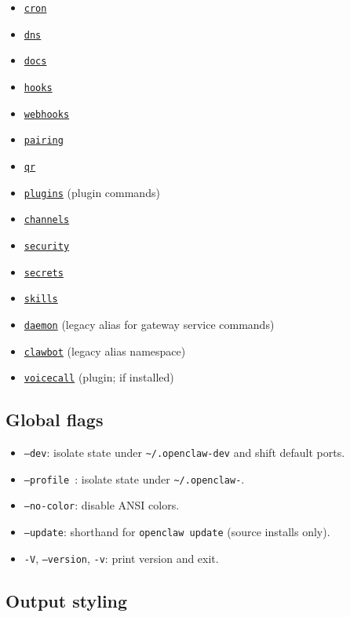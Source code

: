 \begin{itemize}
  \item \href{/cli/cron}{\texttt{cron}}
  \item \href{/cli/dns}{\texttt{dns}}
  \item \href{/cli/docs}{\texttt{docs}}
  \item \href{/cli/hooks}{\texttt{hooks}}
  \item \href{/cli/webhooks}{\texttt{webhooks}}
  \item \href{/cli/pairing}{\texttt{pairing}}
  \item \href{/cli/qr}{\texttt{qr}}
  \item \href{/cli/plugins}{\texttt{plugins}} (plugin commands)
  \item \href{/cli/channels}{\texttt{channels}}
  \item \href{/cli/security}{\texttt{security}}
  \item \href{/cli/secrets}{\texttt{secrets}}
  \item \href{/cli/skills}{\texttt{skills}}
  \item \href{/cli/daemon}{\texttt{daemon}} (legacy alias for gateway service commands)
  \item \href{/cli/clawbot}{\texttt{clawbot}} (legacy alias namespace)
  \item \href{/cli/voicecall}{\texttt{voicecall}} (plugin; if installed)
\end{itemize}


\subsection{Global flags}


\begin{itemize}
  \item \texttt{--dev}: isolate state under \texttt{\textasciitilde{}/.openclaw-dev} and shift default ports.
  \item \texttt{--profile }: isolate state under \texttt{\textasciitilde{}/.openclaw-}.
  \item \texttt{--no-color}: disable ANSI colors.
  \item \texttt{--update}: shorthand for \texttt{openclaw update} (source installs only).
  \item \texttt{-V}, \texttt{--version}, \texttt{-v}: print version and exit.
\end{itemize}


\subsection{Output styling}


